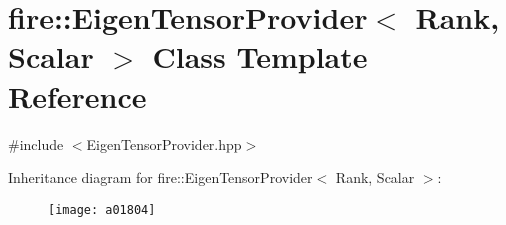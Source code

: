 \hypertarget{a01804}{}\section{fire\+:\+:Eigen\+Tensor\+Provider$<$ Rank, Scalar $>$ Class Template Reference}
\label{a01804}


{\ttfamily \#include $<$Eigen\+Tensor\+Provider.\+hpp$>$}

Inheritance diagram for fire\+:\+:Eigen\+Tensor\+Provider$<$ Rank, Scalar $>$\+:\begin{figure}[H]
\begin{center}
\leavevmode
\texttt{[image: a01804]}
\end{center}
\end{figure}
